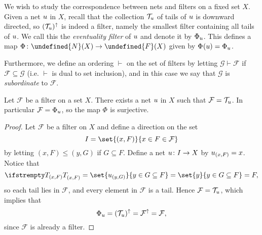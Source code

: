 \documentclass[article, a4paper, 11pt, oneside]{memoir}
\let\mathfrak\undefined
\numberwithin{equation}{chapter}
\newcommand{\calF}{\mathcal{F}}
\newcommand{\calG}{\mathcal{G}}
\theoremstyle{nonumberplain}
\begin{document}
\newcommand{\filter}{\mathfrak{F}}

\newcommand{\filters}[1]{\mathfrak{F}(#1)}
\newcommand{\nets}[1]{\mathfrak{N}(#1)}
\newcommand{\netseq}[1]{\tilde{\mathfrak{N}}(#1)}

\newcommand{\evfilt}[1][]{\Phi_{#1}}
\newcommand{\evfilteq}[1][]{\tilde{\Phi}_{#1}}
\newcommand{\subord}{\vdash}

We wish to study the correspondence between nets and filters on a fixed set $X$. Given a net $u$ in $X$, recall that the collection $\mathcal{T}_{u}$ of tails of $u$ is downward directed, so $(\mathcal{T}_{u})^\uparrow$ is indeed a filter, namely the smallest filter containing all tails of $u$. We call this the \emph{eventuality filter} of $u$ and denote it by $\evfilt[\mynet]$. This defines a map $\evfilt \colon \nets{X} \to \filters{X}$ given by $\evfilt(\mynet) = \evfilt[\mynet]$.

Furthermore, we define an ordering $\subord$ on the set of filters by letting $\calG \subord \calF$ if $\calF \subseteq \calG$ (i.e. $\subord$ is dual to set inclusion), and in this case we say that $\calG$ is \emph{subordinate} to $\calF$.

\begin{lemma}
    Let $\calF$ be a filter on a set $X$. There exists a net $u$ in $X$ such that $\calF = \tails{\mynet}$. In particular $\calF = \evfilt[\mynet]$, so the map $\evfilt$ is surjective.
\end{lemma}

\begin{proof}
    Let $\calF$ be a filter on $X$ and define a direction on the set
    \begin{equation*}
        I
            = \set{(x,F)}{x \in F \in \calF}
    \end{equation*}
    by letting $(x,F) \leq (y,G)$ if $G \subseteq F$. Define a net $u \colon I \to X$ by $u_{(x,F)} = x$. Notice that
    \begin{equation*}
        \tail{(x,F)}
            = \set{ \mynet_{(y,G)} }{ y \in G \subseteq F }
            = \set{ y }{ y \in G \subseteq F }
            = F,
    \end{equation*}
    so each tail lies in $\calF$, and every element in $\calF$ is a tail. Hence $\calF = \tails{\mynet}$, which implies that
    \begin{equation*}
        \evfilt[\mynet]
            = (\tails{\mynet})^\uparrow
            = \calF^\uparrow
            = \calF,
    \end{equation*}
    since $\calF$ is already a filter.
\end{proof}
\end{document}

